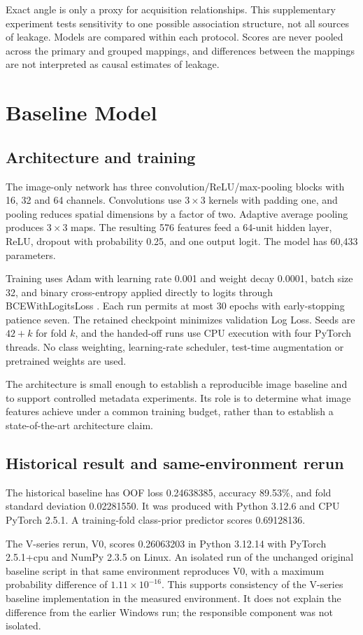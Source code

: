 \documentclass[journal]{IEEEtran}
\begin{document}
Exact angle is only a proxy for acquisition relationships. This supplementary experiment tests sensitivity to one possible association structure, not all sources of leakage. Models are compared within each protocol. Scores are never pooled across the primary and grouped mappings, and differences between the mappings are not interpreted as causal estimates of leakage.

\section{Baseline Model}
\subsection{Architecture and training}
The image-only network has three convolution/ReLU/max-pooling blocks with 16, 32 and 64 channels. Convolutions use $3\times3$ kernels with padding one, and pooling reduces spatial dimensions by a factor of two. Adaptive average pooling produces $3\times3$ maps. The resulting 576 features feed a 64-unit hidden layer, ReLU, dropout with probability 0.25, and one output logit. The model has 60,433 parameters.

Training uses Adam with learning rate 0.001 and weight decay 0.0001, batch size 32, and binary cross-entropy applied directly to logits through BCEWithLogitsLoss \cite{bce}. Each run permits at most 30 epochs with early-stopping patience seven. The retained checkpoint minimizes validation Log Loss. Seeds are $42+k$ for fold $k$, and the handed-off runs use CPU execution with four PyTorch threads. No class weighting, learning-rate scheduler, test-time augmentation or pretrained weights are used.

The architecture is small enough to establish a reproducible image baseline and to support controlled metadata experiments. Its role is to determine what image features achieve under a common training budget, rather than to establish a state-of-the-art architecture claim.

\subsection{Historical result and same-environment rerun}
The historical baseline has OOF loss 0.24638385, accuracy 89.53\%, and fold standard deviation 0.02281550. It was produced with Python 3.12.6 and CPU PyTorch 2.5.1. A training-fold class-prior predictor scores 0.69128136.

The V-series rerun, V0, scores 0.26063203 in Python 3.12.14 with PyTorch 2.5.1+cpu and NumPy 2.3.5 on Linux. An isolated run of the unchanged original baseline script in that same environment reproduces V0, with a maximum probability difference of $1.11\times10^{-16}$. This supports consistency of the V-series baseline implementation in the measured environment. It does not explain the difference from the earlier Windows run; the responsible component was not isolated.
\end{document}
